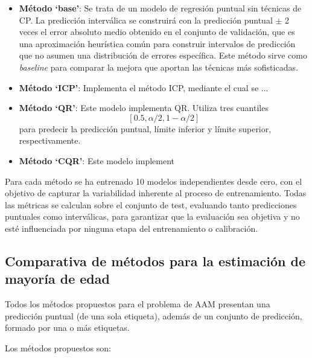 \begin{itemize}

    \item \textbf{Método `base'}: Se trata de un modelo de regresión puntual sin técnicas de CP. La predicción interválica se construirá con la predicción puntual $\pm$ 2 veces el error absoluto medio obtenido en el conjunto de validación, que es una aproximación heurística común para construir intervalos de predicción que no asumen una distribución de errores específica. Este método sirve como \textit{baseline} para comparar la mejora que aportan las técnicas más sofisticadas.

    \item \textbf{Método `ICP'}: Implementa el método ICP, mediante el cual se ...
    
    \item \textbf{Método `QR'}: Este modelo implementa QR. Utiliza tres cuantiles 
    $$
    [0.5, \alpha/2, 1-\alpha/2]
    $$ 
    para predecir la predicción puntual, límite inferior y límite superior, respectivamente.

    \item \textbf{Método `CQR'}: Este modelo implement

\end{itemize} 

Para cada método se ha entrenado 10 modelos independientes desde cero, con el objetivo de capturar la variabilidad inherente al proceso de entrenamiento. Todas las métricas se calculan sobre el conjunto de test, evaluando tanto predicciones puntuales como interválicas, para garantizar que la evaluación sea objetiva y no esté influenciada por ninguna etapa del entrenamiento o calibración. 


\subsection{Comparativa de métodos para la estimación de mayoría de edad}

Todos los métodos propuestos para el problema de AAM presentan una predicción puntual (de una sola etiqueta), además de un conjunto de predicción, formado por una o más etiquetas. 

Los métodos propuestos son:


